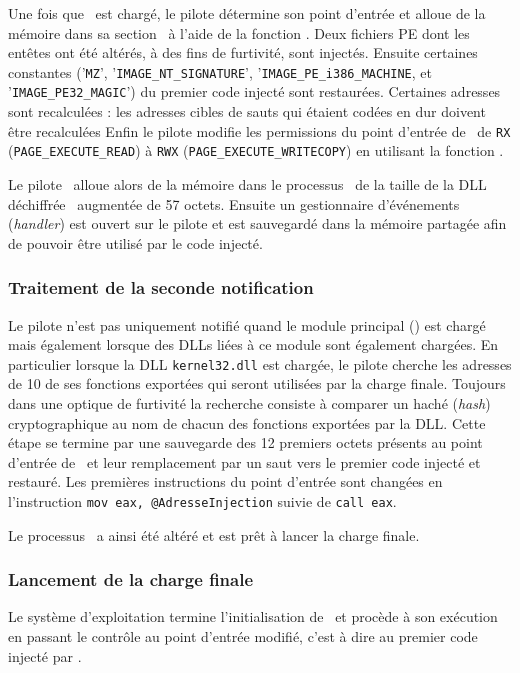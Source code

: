 Une fois que \services\ est chargé, le pilote détermine son point d'entrée et alloue de la mémoire dans sa section \pdata\ à l'aide de la fonction \ZwA.
Deux fichiers PE dont les entêtes ont été altérés, à des fins de furtivité, sont injectés.
Ensuite certaines constantes ('\texttt{MZ}', '\texttt{IMAGE\_NT\_SIGNATURE}', '\texttt{IMAGE\_PE\_i386\_MACHINE}, et '\texttt{IMAGE\_PE32\_MAGIC}') du premier code injecté sont restaurées.
Certaines adresses sont recalculées : les adresses cibles de sauts qui étaient codées en dur doivent être recalculées
Enfin le pilote modifie les permissions du point d'entrée de \services\ de \texttt{RX} (\texttt{PAGE\_EXECUTE\_READ}) à \texttt{RWX} (\texttt{PAGE\_EXECUTE\_WRITECOPY}) en utilisant la fonction \ZwP.

Le pilote \driver\ alloue alors de la mémoire dans le processus \services\ de la taille de la DLL déchiffrée \netpDLL\ augmentée de 57 octets.
Ensuite un gestionnaire d’événements (\emph{handler}) est ouvert sur le pilote et est sauvegardé dans la mémoire partagée afin de pouvoir être utilisé par le code injecté.

\subsubsection{Traitement de la seconde notification}
Le pilote n'est pas uniquement notifié quand le module principal (\services) est chargé mais également lorsque des DLLs liées à ce module sont également chargées.
En particulier lorsque la DLL \texttt{kernel32.dll} est chargée, le pilote cherche les adresses de 10 de ses fonctions exportées qui seront utilisées par la charge finale.
Toujours dans une optique de furtivité la recherche consiste à comparer un haché (\emph{hash}) cryptographique au nom de chacun des fonctions exportées par la DLL.
Cette étape se termine par une sauvegarde des 12 premiers octets présents au point d'entrée de \services\ et leur remplacement par un saut vers le premier code injecté et restauré.
Les premières instructions du point d'entrée sont changées en l'instruction \texttt{mov eax, @AdresseInjection} suivie de \texttt{call eax}.

Le processus \services\ a ainsi été altéré et est prêt à lancer la charge finale.

\subsubsection{Lancement de la charge finale}
Le système d'exploitation termine l'initialisation de \services\ et procède à son exécution en passant le contrôle au point d'entrée modifié, c'est à dire au premier code injecté par \duqu.

